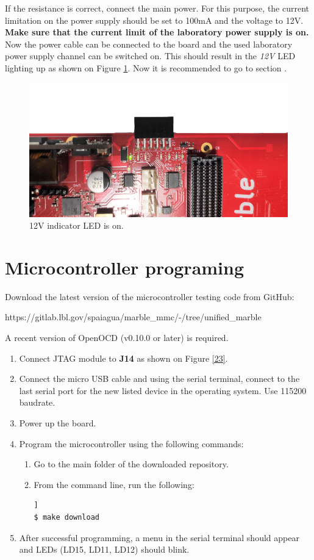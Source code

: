 \documentclass[12pt,oneside,a4]{article}
\begin{document}
If the resistance is correct, connect the main power. For this purpose, the current limitation on the power supply should be set to 100mA and the voltage to 12V. \textbf{Make sure that the current limit of the laboratory power supply is on.} Now the power cable can be connected to the board and the used laboratory power supply channel can be switched on.
This should result in the \textit{12V} LED lighting up as shown  on Figure \ref{02}. Now it is recommended to go to section .
\begin{figure}[H]
\begin{center}
\includegraphics[width=0.8\linewidth, angle = 180]{xrpoff.png}
 \caption{12V indicator LED is on. }\label{02}
\end{center}
\end{figure}

\section{Microcontroller programing}
\label{microcontroller}

Download the latest version of the microcontroller testing code from GitHub:
\begin{leftbar}
https://gitlab.lbl.gov/spaiagua/marble\_mmc/-/tree/unified\_marble
\end{leftbar}

A recent version of OpenOCD (v0.10.0 or later) is required.
\begin{enumerate}
	\item Connect JTAG module to \textbf{J14} as shown on Figure \ref{23}.
	\item Connect the micro USB cable and using the serial terminal, connect to the last serial port for the new listed device in the operating system. Use 115200 baudrate.
	\item Power up the board.
	\item Program the microcontroller using the following commands:
	\begin{enumerate}
	\item Go to the main folder of the downloaded repository.
	\item From the command line, run the following:
	\begin{lstlisting}[backgroundcolor = \color{Gainsboro}, language=bash, frame=none]]
$ make download
	\end{lstlisting}
	\end{enumerate}
	\item After successful programming, a menu in the serial terminal should appear and LEDs (LD15, LD11, LD12) should blink.
\end{enumerate}
\end{document}
